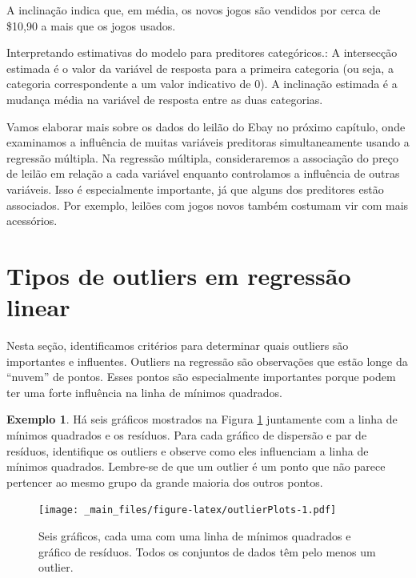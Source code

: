\documentclass[
]{book}
\theoremstyle{definition}
\theoremstyle{definition}
\newtheorem{example}{Exemplo}[chapter]
\theoremstyle{definition}
\theoremstyle{definition}
\theoremstyle{remark}
\begin{document}
A inclinação indica que, em média, os novos jogos são vendidos por cerca de \$10,90 a mais que os jogos usados.

Interpretando estimativas do modelo para preditores categóricos.: A intersecção estimada é o valor da variável de resposta para a primeira categoria (ou seja, a categoria correspondente a um valor indicativo de 0). A inclinação estimada é a mudança média na variável de resposta entre as duas categorias.

Vamos elaborar mais sobre os dados do leilão do Ebay no próximo capítulo, onde examinamos a influência de muitas variáveis preditoras simultaneamente usando a regressão múltipla. Na regressão múltipla, consideraremos a associação do preço de leilão em relação a cada variável enquanto controlamos a influência de outras variáveis. Isso é especialmente importante, já que alguns dos preditores estão associados. Por exemplo, leilões com jogos novos também costumam vir com mais acessórios.

\hypertarget{typesOfOutliersInLinearRegression}{%
\section{Tipos de outliers em regressão linear}\label{typesOfOutliersInLinearRegression}}

Nesta seção, identificamos critérios para determinar quais outliers são importantes e influentes. Outliers na regressão são observações que estão longe da ``nuvem'' de pontos. Esses pontos são especialmente importantes porque podem ter uma forte influência na linha de mínimos quadrados.

\begin{example}
\protect\hypertarget{exm:outlierPlotsExample}{}{\label{exm:outlierPlotsExample} }Há seis gráficos mostrados na Figura \ref{fig:outlierPlots} juntamente com a linha de mínimos quadrados e os resíduos. Para cada gráfico de dispersão e par de resíduos, identifique os outliers e observe como eles influenciam a linha de mínimos quadrados. Lembre-se de que um outlier é um ponto que não parece pertencer ao mesmo grupo da grande maioria dos outros pontos.
\end{example}

\begin{figure}
\centering
\texttt{[image: \_main\_files/figure-latex/outlierPlots-1.pdf]}
\caption{\label{fig:outlierPlots}Seis gráficos, cada uma com uma linha de mínimos quadrados e gráfico de resíduos. Todos os conjuntos de dados têm pelo menos um outlier.}
\end{figure}
\end{document}

